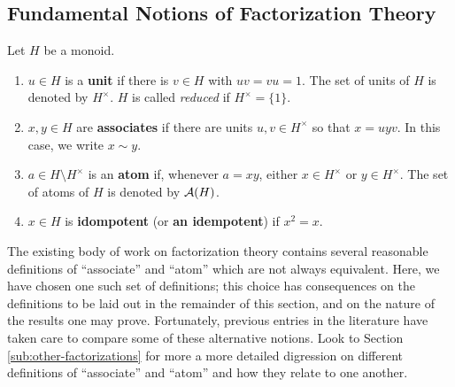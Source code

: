 
\subsection{Fundamental Notions of Factorization Theory} \label{subsec:factorizations}


\begin{defn} \label{defn:atom}
Let $H$ be a monoid.
\begin{enumerate}
\item $u\in H$ is a \textbf{unit} if there is $v\in H$ with $uv = vu = 1$.  
The set of units of $H$ is denoted by $H^\times$.  
$H$ is called \textit{reduced} if $H^\times = \{1\}$.
\item $x,y\in H$ are \textbf{associates} if there are units $u,v\in H^\times$ so that $x = uyv$. In this case, we write $x \sim y$.
\item $a\in H\setminus H^\times$ is an \textbf{atom} if, whenever $a = xy$, either $x\in H^\times$ or $y\in H^\times$. The set of atoms of $H$ is denoted by $\mathcal{A}(H)$.
\item $x\in H$ is \textbf{idompotent} (or \textbf{an idempotent}) if $x^2 = x$.
\end{enumerate}
\end{defn}

The existing body of work on factorization theory contains several reasonable definitions of ``associate'' and ``atom'' which are not always equivalent.
Here, we have chosen one such set of definitions; this choice has consequences on the definitions to be laid out in the remainder of this section, and on the nature of the results one may prove.
Fortunately, previous entries in the literature have taken care to compare some of these alternative notions.
Look to Section \ref{sub:other-factorizations} for more a more detailed digression on different definitions of ``associate'' and ``atom'' and how they relate to one another.

